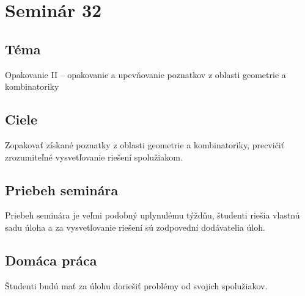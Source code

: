 \section*{Seminár 32}
\subsection*{Téma}
Opakovanie II -- opakovanie a upevňovanie poznatkov z oblasti geometrie a kombinatoriky

\subsection*{Ciele}
Zopakovať získané poznatky z oblasti geometrie a kombinatoriky, precvičiť zrozumiteľné vysvetľovanie riešení spolužiakom.

\subsection*{Priebeh seminára}
Priebeh seminára je veľmi podobný uplynulému týždňu, študenti riešia vlastnú sadu úloha a za vysvetľovanie riešení sú zodpovední dodávatelia úloh.

\subsection*{Domáca práca}
Študenti budú mať za úlohu doriešiť problémy od svojich spolužiakov.

